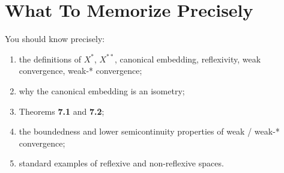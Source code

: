 \documentclass[header={Lecture 4 Exam Study Notes}]{study-note}
\begin{document}
\section{What To Memorize Precisely}

\begin{focusbox}
You should know precisely:
\begin{enumerate}
\item the definitions of $X^*$, $X^{**}$, canonical embedding, reflexivity, weak convergence, weak-* convergence;
\item why the canonical embedding is an isometry;
\item Theorems \textbf{7.1} and \textbf{7.2};
\item the boundedness and lower semicontinuity properties of weak / weak-* convergence;
\item standard examples of reflexive and non-reflexive spaces.
\end{enumerate}
\end{focusbox}
\end{document}
